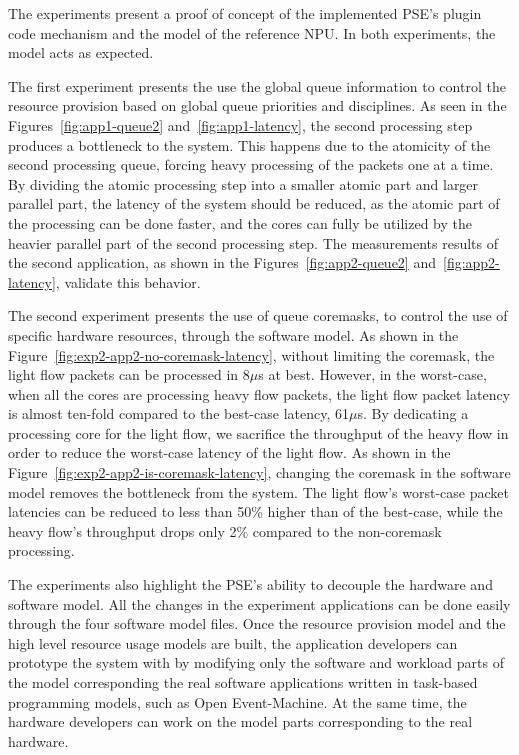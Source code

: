 The experiments present a proof of concept of the implemented PSE's plugin code mechanism and the model of the reference NPU. In both experiments, the model acts as expected.

The first experiment presents the use the global queue information to control the resource provision based on global queue priorities and disciplines. As seen in the Figures~\ref{fig:app1-queue2} and~\ref{fig:app1-latency}, the second processing step produces a bottleneck to the system. This happens due to the atomicity of the second processing queue, forcing heavy processing of the packets one at a time. By dividing the atomic processing step into a smaller atomic part and larger parallel part, the latency of the system should be reduced, as the atomic part of the processing can be done faster, and the cores can fully be utilized by the heavier parallel part of the second processing step. The measurements results of the second application, as shown in the Figures~\ref{fig:app2-queue2} and~\ref{fig:app2-latency}, validate this behavior.

The second experiment presents the use of queue coremasks, to control the use of specific hardware resources, through the software model. As shown in the Figure~\ref{fig:exp2-app2-no-coremask-latency}, without limiting the coremask, the light flow packets can be processed in 8$\mu$s at best. However, in the worst-case, when all the cores are processing heavy flow packets, the light flow packet latency is almost ten-fold compared to the best-case latency, 61$\mu$s. By dedicating a processing core for the light flow, we sacrifice the throughput of the heavy flow in order to reduce the worst-case latency of the light flow. As shown in the Figure~\ref{fig:exp2-app2-is-coremask-latency}, changing the coremask in the software model removes the bottleneck from the system. The light flow's worst-case packet latencies can be reduced to less than 50\% higher than of the best-case, while the heavy flow's throughput drops only 2\% compared to the non-coremask processing.

The experiments also highlight the PSE's ability to decouple the hardware and software model. All the changes in the experiment applications can be done easily through the four software model files. Once the resource provision model and the high level resource usage models are built, the application developers can prototype the system with by modifying only the software and workload parts of the model corresponding the real software applications written in task-based programming models, such as Open Event-Machine. At the same time, the hardware developers can work on the model parts corresponding to the real hardware.


